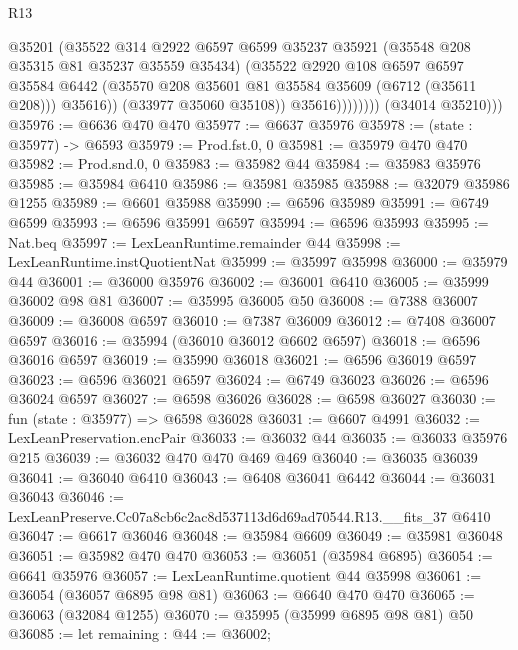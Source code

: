 \begin{lexlean}{R13}
\begin{coremodule}
                          @35201
                          (@35522
                            @314
                            @2922
                            @6597
                            @6599
                            @35237
                            @35921
                            (@35548 @208 @35315 @81 @35237 @35559 @35434)
                            (@35522
                              @2920
                              @108
                              @6597
                              @6597
                              @35584
                              @6442
                              (@35570 @208 @35601 @81 @35584 @35609 (@6712 (@35611 @208)))
                              @35616))
                          (@33977 @35060 @35108))
                        @35616))))))))
        (@34014 @35210)))
@35976 := @6636 @470 @470
@35977 := @6637 @35976
@35978 := (state : @35977) -> @6593
@35979 := Prod.fst.{0, 0}
@35981 := @35979 @470 @470
@35982 := Prod.snd.{0, 0}
@35983 := @35982 @44
@35984 := @35983 @35976
@35985 := @35984 @6410
@35986 := @35981 @35985
@35988 := @32079 @35986 @1255
@35989 := @6601 @35988
@35990 := @6596 @35989
@35991 := @6749 @6599
@35993 := @6596 @35991 @6597
@35994 := @6596 @35993
@35995 := Nat.beq
@35997 := LexLeanRuntime.remainder @44
@35998 := LexLeanRuntime.instQuotientNat
@35999 := @35997 @35998
@36000 := @35979 @44
@36001 := @36000 @35976
@36002 := @36001 @6410
@36005 := @35999 @36002 @98 @81
@36007 := @35995 @36005 @50
@36008 := @7388 @36007
@36009 := @36008 @6597
@36010 := @7387 @36009
@36012 := @7408 @36007 @6597
@36016 := @35994 (@36010 @36012 @6602 @6597)
@36018 := @6596 @36016 @6597
@36019 := @35990 @36018
@36021 := @6596 @36019 @6597
@36023 := @6596 @36021 @6597
@36024 := @6749 @36023
@36026 := @6596 @36024 @6597
@36027 := @6598 @36026
@36028 := @6598 @36027
@36030 := fun (state : @35977) => @6598 @36028
@36031 := @6607 @4991
@36032 := LexLeanPreservation.encPair
@36033 := @36032 @44
@36035 := @36033 @35976 @215
@36039 := @36032 @470 @470 @469 @469
@36040 := @36035 @36039
@36041 := @36040 @6410
@36043 := @6408 @36041 @6442
@36044 := @36031 @36043
@36046 := LexLeanPreserve.Cc07a8cb6c2ac8d537113d6d69ad70544.R13.__fits_37 @6410
@36047 := @6617 @36046
@36048 := @35984 @6609
@36049 := @35981 @36048
@36051 := @35982 @470 @470
@36053 := @36051 (@35984 @6895)
@36054 := @6641 @35976
@36057 := LexLeanRuntime.quotient @44 @35998
@36061 := @36054 (@36057 @6895 @98 @81)
@36063 := @6640 @470 @470
@36065 := @36063 (@32084 @1255)
@36070 := @35995 (@35999 @6895 @98 @81) @50
@36085 := let remaining : @44 := @36002;

\end{coremodule}
\end{lexlean}
